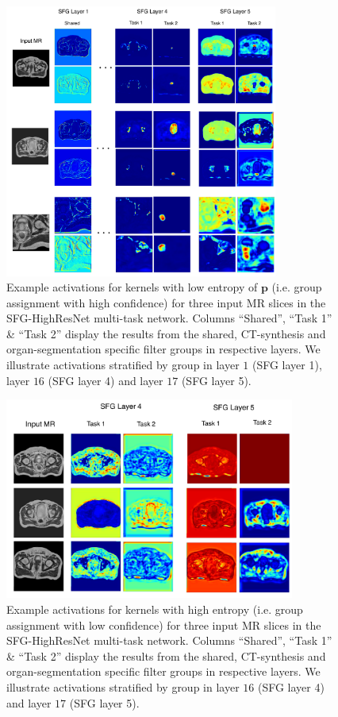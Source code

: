 \begin{figure}[h]
    \centering
    \vspace{-4mm}
    \includegraphics[width=0.8\textwidth]{chapter_6/figures_supp/figure_1.pdf}
    \vspace{-2mm}
    \caption{Example activations for kernels with low entropy of $\mathbf{p}$ (i.e. group assignment with high confidence) for three input MR slices in the SFG-HighResNet multi-task network. Columns ``Shared'', ``Task 1'' \& ``Task 2'' display the results from the shared, CT-synthesis and organ-segmentation specific filter groups in respective layers. We illustrate activations stratified by group in layer $1$ (SFG layer 1), layer $16$ (SFG layer 4) and layer $17$ (SFG layer 5). }
    \label{fig:act}
    \vspace{-1mm}
\end{figure}

\begin{figure}[h]
    \centering
    \includegraphics[width=0.85\textwidth]{chapter_6/figures_supp/uncertain_activation.pdf}
    \caption{Example activations for kernels with high entropy (i.e. group assignment with low confidence) for three input MR slices in the SFG-HighResNet multi-task network.  Columns ``Shared'', ``Task 1'' \& ``Task 2'' display the results from the shared, CT-synthesis and organ-segmentation specific filter groups in respective layers. We illustrate activations stratified by group in layer $16$ (SFG layer 4) and layer $17$ (SFG layer 5). }
    \label{fig:act_unc}
\end{figure}
